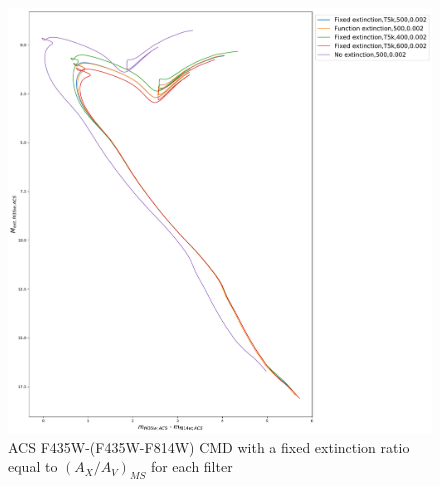 \documentclass[12pt, a4paper]{report}
\begin{document}
\begin{figure}[h]
\begin{center}
\includegraphics[width=1.0\textwidth]{../basti_isochrones_10_13Gyr/Extinction_T5k_FeH0fix_func_f435wACS_f435wACSmf814wACS_500_400_600_Myr_FeH_0p002_ref_noext_Av_1p0.pdf}
\caption{ACS F435W-(F435W-F814W) CMD with a fixed extinction ratio equal to $(A_{X}/A_{V})_{MS}$ for each filter}
\label{acs_isoc_T5k}
\end{center}
\end{figure}
\end{document}
